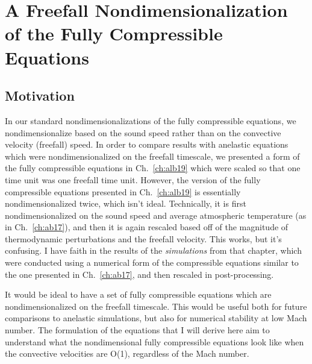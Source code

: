 \section{A Freefall Nondimensionalization of the Fully Compressible Equations}
\label{sec:freefall_fc_nondim}
\subsection{Motivation}
In our standard nondimensionalizations of the fully compressible equations, we nondimensionalize based on the sound speed rather than on the convective velocity (freefall) speed.
In order to compare results with anelastic equations which were nondimensionalized on the freefall timescale, we presented a form of the fully compressible equations in Ch.~\ref{ch:alb19} which were scaled so that one time unit was one freefall time unit. 
However, the version of the fully compressible equations presented in Ch.~\ref{ch:alb19} is essentially nondimensionalized twice, which isn't ideal.
Technically, it is first nondimensionalized on the sound speed and average atmospheric temperature (as in Ch.~\ref{ch:ab17}), and then it is again rescaled based off of the magnitude of thermodynamic perturbations and the freefall velocity.
This works, but it's confusing.
I have faith in the results of the \emph{simulations} from that chapter, which were conducted using a numerical form of the compressible equations similar to the one presented in Ch.~\ref{ch:ab17}, and then rescaled in post-processing.

It would be ideal to have a set of fully compressible equations which are nondimensionalized on the freefall timescale.
This would be useful both for future comparisons to anelastic simulations, but also for numerical stability at low Mach number. 
The formulation of the equations that I will derive here aim to understand what the nondimensional fully compressible equations look like when the convective velocities are O(1), regardless of the Mach number.

